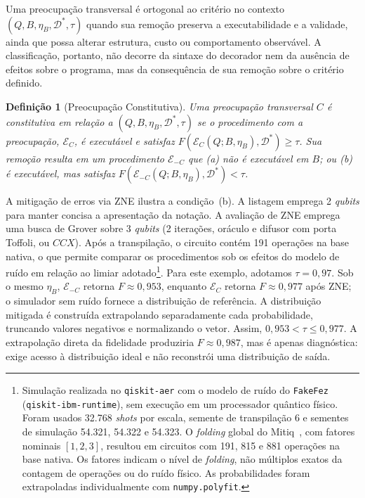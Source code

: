 \documentclass[sigconf]{acmart}
\newtheorem{definition}{Definição}
\begin{document}
Uma preocupação transversal é ortogonal ao critério no contexto $(Q,B,\eta_B,\mathcal{D}^*,\tau)$ quando sua remoção preserva a executabilidade e a validade, ainda que possa alterar estrutura, custo ou comportamento observável. A classificação, portanto, não decorre da sintaxe do decorador nem da ausência de efeitos sobre o programa, mas da consequência de sua remoção sobre o critério definido.

\begin{definition}[Preocupação Constitutiva]
\label{def:constitutive-concern}
Uma preocupação transversal $C$ é \emph{constitutiva} em relação a $(Q,B,\eta_B,\mathcal{D}^*,\tau)$ se o procedimento com a preocupação, $\mathcal{E}_C$, é executável e satisfaz $F(\mathcal{E}_C(Q;B,\eta_B),\mathcal{D}^*)\geq\tau$. Sua remoção resulta em um procedimento $\mathcal{E}_{-C}$ que \emph{(a)} não é executável em $B$; ou \emph{(b)} é executável, mas satisfaz $F(\mathcal{E}_{-C}(Q;B,\eta_B),\mathcal{D}^*)<\tau$.
\end{definition}

A mitigação de erros via ZNE ilustra a condição~(b). A listagem emprega 2 \textit{qubits} para manter concisa a apresentação da notação. A avaliação de ZNE emprega uma busca de Grover sobre 3 \textit{qubits} (2 iterações, oráculo e difusor com porta Toffoli, ou $CCX$). Após a transpilação, o circuito contém 191 operações na base nativa, o que permite comparar os procedimentos sob os efeitos do modelo de ruído em relação ao limiar adotado\footnote{Simulação realizada no \texttt{qiskit-aer} com o modelo de ruído do \texttt{FakeFez} (\texttt{qiskit-ibm-runtime}), sem execução em um processador quântico físico. Foram usados 32.768 \textit{shots} por escala, semente de transpilação 6 e sementes de simulação 54.321, 54.322 e 54.323. O \textit{folding} global do Mitiq~\cite{larose2022}, com fatores nominais $[1,2,3]$, resultou em circuitos com 191, 815 e 881 operações na base nativa. Os fatores indicam o nível de \textit{folding}, não múltiplos exatos da contagem de operações ou do ruído físico. As probabilidades foram extrapoladas individualmente com \texttt{numpy.polyfit}.}. Para este exemplo, adotamos $\tau=0{,}97$. Sob o mesmo $\eta_B$, $\mathcal{E}_{-C}$ retorna $F\approx0{,}953$, enquanto $\mathcal{E}_C$ retorna $F\approx0{,}977$ após ZNE; o simulador sem ruído fornece a distribuição de referência. A distribuição mitigada é construída extrapolando separadamente cada probabilidade, truncando valores negativos e normalizando o vetor. Assim, $0{,}953<\tau\leq0{,}977$. A extrapolação direta da fidelidade produziria $F\approx0{,}987$, mas é apenas diagnóstica: exige acesso à distribuição ideal e não reconstrói uma distribuição de saída.
\end{document}
